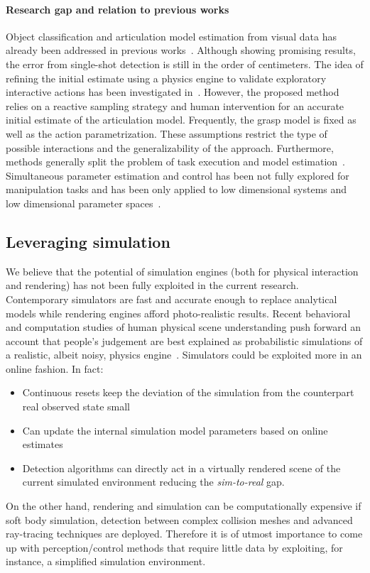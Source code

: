 \paragraph{Research gap and relation to previous works} Object classification and articulation model estimation from visual data has already been addressed in previous works~\cite{he2017mask, li2020category}. Although showing promising results, the error from single-shot detection is still in the order of centimeters. The idea of refining the initial estimate using a physics engine to validate exploratory interactive actions has been investigated in~\cite{eppner2018physics}. However, the proposed method relies on a reactive sampling strategy and human intervention for an accurate initial estimate of the articulation model. Frequently, the grasp model is fixed as well as the action parametrization. These assumptions restrict the type of possible interactions and the generalizability of the approach. Furthermore, methods generally split the problem of task execution and model estimation~\cite{eppner2018physics}. Simultaneous parameter estimation and control has been not fully explored for manipulation tasks and has been only applied to low dimensional systems and low dimensional parameter spaces~\cite{barcelos2021dual}. 

\subsection{Leveraging simulation} We believe that the potential of simulation engines (both for physical interaction and rendering) has not been fully exploited in the current research. Contemporary simulators are fast and accurate enough to replace analytical models while rendering engines afford photo-realistic results. Recent behavioral and computation studies of human physical scene understanding push forward an account that people's judgement are best explained as probabilistic simulations of a realistic, albeit noisy, physics engine~\cite{wu2015galileo}.
Simulators could be exploited more in an online fashion. In fact: 
\begin{itemize}
\item Continuous resets keep the deviation of the simulation from the counterpart real observed state small
\item Can update the internal simulation model parameters based on online estimates
\item Detection algorithms can directly act in a virtually rendered scene of the current simulated environment reducing the \emph{sim-to-real} gap.
\end{itemize}
On the other hand, rendering and simulation can be computationally expensive if soft body simulation, detection between complex collision meshes and advanced ray-tracing techniques are deployed. Therefore it is of utmost importance to come up with perception/control methods that require little data by exploiting, for instance, a simplified simulation environment. 

